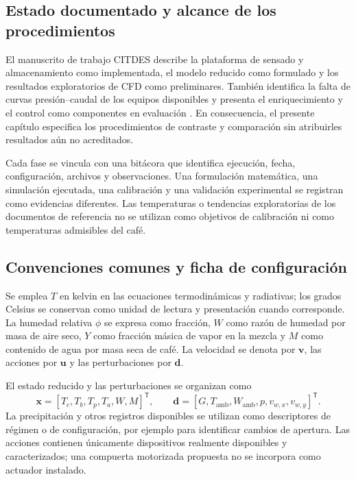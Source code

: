 \subsection{Estado documentado y alcance de los procedimientos}

El manuscrito de trabajo CITDES describe la plataforma de sensado y almacenamiento como implementada, el modelo reducido como formulado y los resultados exploratorios de CFD como preliminares. También identifica la falta de curvas presión--caudal de los equipos disponibles y presenta el enriquecimiento y el control como componentes en evaluación \cite{rodriguez2026marco}. En consecuencia, el presente capítulo especifica los procedimientos de contraste y comparación sin atribuirles resultados aún no acreditados.

Cada fase se vincula con una bitácora que identifica ejecución, fecha, configuración, archivos y observaciones. Una formulación matemática, una simulación ejecutada, una calibración y una validación experimental se registran como evidencias diferentes. Las temperaturas o tendencias exploratorias de los documentos de referencia no se utilizan como objetivos de calibración ni como temperaturas admisibles del café.

\subsection{Convenciones comunes y ficha de configuración}

Se emplea $T$ en kelvin en las ecuaciones termodinámicas y radiativas; los grados Celsius se conservan como unidad de lectura y presentación cuando corresponde. La humedad relativa $\phi$ se expresa como fracción, $W$ como razón de humedad por masa de aire seco, $Y$ como fracción másica de vapor en la mezcla y $M$ como contenido de agua por masa seca de café. La velocidad se denota por $\mathbf v$, las acciones por $\mathbf u$ y las perturbaciones por $\mathbf d$.

El estado reducido y las perturbaciones se organizan como
\begin{equation}
\mathbf x=[T_c,T_b,T_p,T_a,W,M]^{\mathsf T},
\qquad
\mathbf d=[G,T_{\mathrm{amb}},W_{\mathrm{amb}},p,v_{w,x},v_{w,y}]^{\mathsf T}.
\label{met:estados_entradas}
\end{equation}
La precipitación y otros registros disponibles se utilizan como descriptores de régimen o de configuración, por ejemplo para identificar cambios de apertura. Las acciones contienen únicamente dispositivos realmente disponibles y caracterizados; una compuerta motorizada propuesta no se incorpora como actuador instalado.

